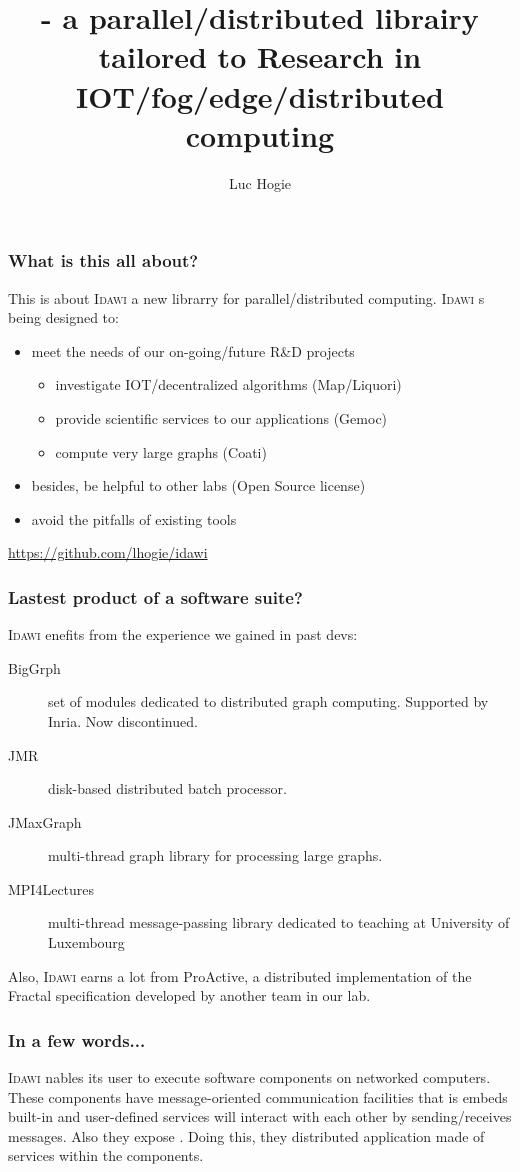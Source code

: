 \documentclass[11pt]{beamer}
\author{Luc Hogie}
\title{\idawi - a parallel/distributed librairy tailored to Research in IOT/fog/edge/distributed computing}
\institute{Cnrs/Inria/Université Côte d'Azur}
\newcommand{\idawi}[1]{\textsc{Idawi}\xspace}
\begin{document}
\begin{frame}
\titlepage
\end{frame}



\begin{frame}
\frametitle{What is this all about?}
This is about \idawi, a new librarry for parallel/distributed computing.
\idawi is being designed to:
\begin{itemize}
	\item meet the needs of our on-going/future R\&D projects
		\begin{itemize}
			\item investigate IOT/decentralized algorithms (Map/Liquori)
			\item provide scientific services to our applications (Gemoc)
			\item compute very large graphs (Coati)
		\end{itemize}
	\item besides, be helpful to other labs (Open Source license)
	\item avoid the pitfalls of existing tools
\end{itemize}
\url{https://github.com/lhogie/idawi}
\end{frame}


\begin{frame}
\frametitle{Lastest product of a software suite?}
\idawi benefits from the experience we gained in past devs:
\begin{description}
	\item[BigGrph] set of modules dedicated to distributed graph computing. Supported by Inria. Now discontinued.
	\item[JMR] disk-based distributed batch processor.
	\item[JMaxGraph] multi-thread graph library for   processing large graphs.
	\item[MPI4Lectures]multi-thread message-passing library dedicated to teaching at University of Luxembourg
\end{description}
Also, \idawi learns a lot from ProActive,  a distributed implementation of the Fractal specification  developed by another team in our lab.
\end{frame}


\begin{frame}
\frametitle{In a few words...}
\idawi enables its user to execute software components on networked computers. These components have message-oriented communication facilities that is embeds built-in and user-defined services   will interact with each other by sending/receives messages. Also they expose . Doing this, they  distributed application made of services within the components.
\end{frame}
\end{document}

